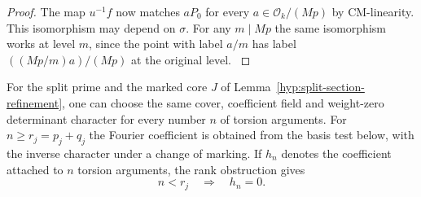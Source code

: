 \begin{proof}
The map \(u^{-1}f\) now matches \(aP_0\) for every \(a\in\mathcal O_k/(Mp)\) by CM-linearity. This isomorphism may depend on \(\sigma\). For any \(m\mid Mp\) the
same isomorphism works at level \(m\), since the point with
label \(a/m\) has label \(((Mp/m)a)/(Mp)\) at the original
level.
\label{cor:split-level-sections-1}
\end{proof}

\begin{proposition}\label{prop:split-level-sections}
For the split prime and the marked core \(J\) of Lemma~\ref{hyp:split-section-refinement},
one can choose the same cover, coefficient field and weight-zero
determinant character for every number \(n\) of torsion arguments.
For \(n\ge r_j=p_j+q_j\) the Fourier coefficient is obtained from
the basis test below, with the inverse character under a change of
marking. If \(h_n\) denotes the coefficient attached to \(n\) torsion arguments, the rank obstruction gives
\[
 n<r_j\quad\Longrightarrow\quad h_n=0.
\]
\end{proposition}

